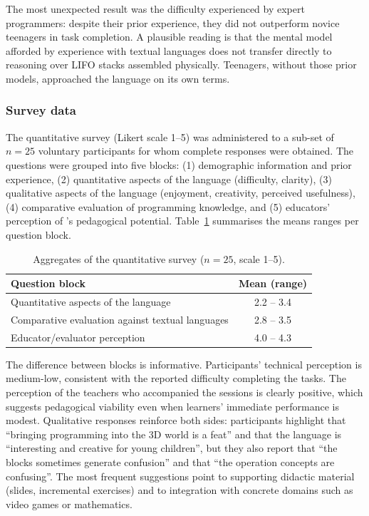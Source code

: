The most unexpected result was the difficulty experienced by expert programmers: despite their prior experience, they did not outperform novice teenagers in task completion.
A plausible reading is that the mental model afforded by experience with textual languages does not transfer directly to reasoning over LIFO stacks assembled physically.
Teenagers, without those prior models, approached the language on its own terms.

\subsubsection*{Survey data}
The quantitative survey (Likert scale 1--5) was administered to a sub-set of $n=25$ voluntary participants for whom complete responses were obtained.
The questions were grouped into five blocks: (1) demographic information and prior experience, (2) quantitative aspects of the language (\eg difficulty, clarity), (3) qualitative aspects of the language (\eg enjoyment, creativity, perceived usefulness), (4) comparative evaluation of programming knowledge, and (5) educators' perception of \sculpt's pedagogical potential.
Table~\ref{tab:survey-likert} summarises the means ranges per question block.

\begin{table}[h]
\centering
\small
\caption{Aggregates of the quantitative survey ($n=25$, scale 1--5).}
\label{tab:survey-likert}
\begin{tabular}{@{}lc@{}}
\toprule
Question block & Mean (range) \\
\midrule
Quantitative aspects of the language              & 2.2 -- 3.4 \\
Comparative evaluation against textual languages  & 2.8 -- 3.5 \\
Educator/evaluator perception                     & 4.0 -- 4.3 \\
\bottomrule
\end{tabular}
\end{table}

The difference between blocks is informative.
Participants' technical perception is medium-low, consistent with the reported difficulty completing the tasks.
The perception of the teachers who accompanied the sessions is clearly positive, which suggests pedagogical viability even when learners' immediate performance is modest.
Qualitative responses reinforce both sides: participants highlight that ``bringing programming into the 3D world is a feat'' and that the language is ``interesting and creative for young children'', but they also report that ``the blocks sometimes generate confusion'' and that ``the operation concepts are confusing''.
The most frequent suggestions point to supporting didactic material (slides, incremental exercises) and to integration with concrete domains such as video games or mathematics.

